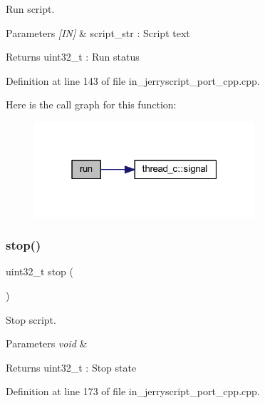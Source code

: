 Run script. 


\begin{DoxyParams}{Parameters}
{\em \mbox{[}\+I\+N\mbox{]}} & script\+\_\+str \+: Script text \\
\hline
\end{DoxyParams}
\begin{DoxyReturn}{Returns}
uint32\+\_\+t \+: Run status 
\end{DoxyReturn}


Definition at line 143 of file in\+\_\+jerryscript\+\_\+port\+\_\+cpp.\+cpp.

Here is the call graph for this function\+:
\nopagebreak
\begin{figure}[H]
\begin{center}
\leavevmode
\includegraphics[width=232pt]{group___port_gafacd49c835b8497d00c0a928232b12e2_cgraph}
\end{center}
\end{figure}
\mbox{\label{group___port_ga317e8c9771295ad8aba4e6b3fe79904a}} 
\subsubsection{stop()}
{\footnotesize\ttfamily uint32\+\_\+t stop (\begin{DoxyParamCaption}\item[{void}]{ }\end{DoxyParamCaption})}



Stop script. 


\begin{DoxyParams}{Parameters}
{\em void} & \\
\hline
\end{DoxyParams}
\begin{DoxyReturn}{Returns}
uint32\+\_\+t \+: Stop state 
\end{DoxyReturn}


Definition at line 173 of file in\+\_\+jerryscript\+\_\+port\+\_\+cpp.\+cpp.

